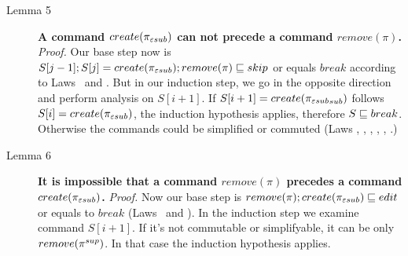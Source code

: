 \begin{description}
\item[Lemma 5]
{\bf A command \(create(\pi_{\varepsilon sub})\) can not precede a command
\(remove(\pi)\).} 
\emph{Proof.} 
Our base step now is 
\(S[j-1];S[j]=create({\pi_{\varepsilon sub}}); remove(\pi)\sqsubseteq skip\) or equals
\(break\) according to Laws \lawxxvii~and \lawxvii.
But in our induction step, we go in the opposite direction and perform
analysis on \(S[i+1]\).
If \(S[i+1]=create({\pi_{\varepsilon sub}}_{sub})\) follows \(S[i]=create(\pi_{\varepsilon sub})\),
the induction hypothesis applies, therefore \(S\sqsubseteq break\). Otherwise
the commands could be simplified or commuted (Laws \lawxviii, \lawxiv,
\lawxv, \lawxvi, \lawxvii, \lawxxvii.)

\item[Lemma 6] 
{\bf It is impossible that a command \(remove(\pi)\)
precedes a command \(create(\pi_{\varepsilon sub})\).} 
\emph{Proof.} 
Now our base step is
\(remove(\pi); create(\pi_{\varepsilon sub})\sqsubseteq edit\) or equals to
\(break\) (Laws \lawxxviii~and \lawxx). In the induction step we
examine command \(S[i+1]\). 
If it's not commutable or simplifyable,
it can be only \(remove(\pi^{sup})\).
In that case the induction hypothesis applies.
\end{description}


